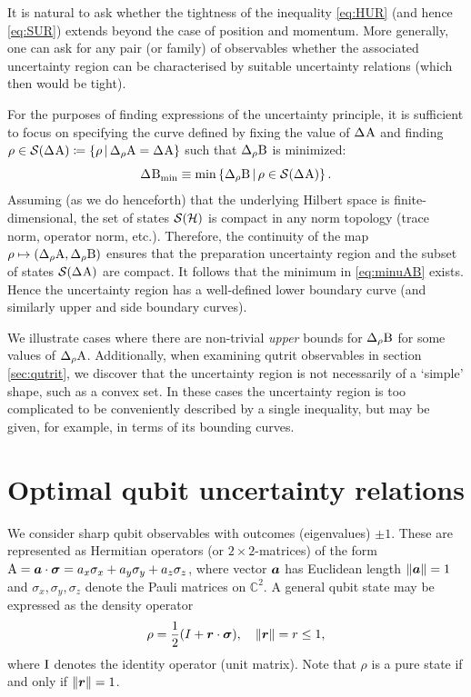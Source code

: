 It is natural to ask whether the tightness of the inequality \eqref{eq:HUR} (and hence \eqref{eq:SUR}) extends beyond the case of position and momentum. More generally, one can ask for any pair (or family) of observables whether the associated uncertainty region can be characterised by suitable uncertainty relations (which then would be tight).

For the purposes of finding expressions of the uncertainty principle, it is sufficient to focus on specifying the curve defined by fixing the value of $\sdev{\opa}$ and finding $\rho\in\si(\sdev{\opa})\coloneqq\{\rho\,|\,\sdevr{\opa}=\sdev{\opa}\}$ such that $\sdevr{\opb}$ is minimized:
\begin{equation}\label{eq:minuAB}
  \sdevmin{\opb}\equiv\min\left\{\sdevr{\opb}\,|\,\rho \in\si(\sdev{\opa}) \right\}.
\end{equation}
Assuming (as we do henceforth) that the underlying Hilbert space is finite-dimensional, the set of states $\mathcal{S}(\mathcal{H})$ is compact in any norm topology (trace norm, operator norm, etc.). Therefore, the continuity of the map $\rho\mapsto (\sdevr{\opa},\sdevr{\opb})$ ensures that the preparation uncertainty region and the subset of states $\si(\sdev{\opa})$ are  compact. It follows that the minimum in \eqref{eq:minuAB} exists. Hence the uncertainty region has a well-defined  lower boundary curve (and similarly upper and side boundary curves).

We illustrate cases where there are non-trivial \emph{upper} bounds for $\sdevr{\opb}$ for some values of $\sdevr{\opa}$. Additionally, when examining qutrit observables in section \ref{sec:qutrit}, we discover that the uncertainty region is not necessarily of a `simple' shape, such as a convex set. In these cases the uncertainty region is too complicated to be conveniently described by a single inequality, but may be given, for example, in terms of its bounding curves.

\section{Optimal qubit uncertainty relations}\label{sec:qubit}

We consider sharp qubit observables with outcomes (eigenvalues) $\pm 1$. These are represented as Hermitian operators (or $2\times 2$-matrices) of the form $\operatorname{A}=\bm{a}\cdot{\boldsymbol\sigma}=a_x\sigma_x+a_y\sigma_y+a_z\sigma_z$, where vector $\bm{a}$ has Euclidean length  $\|\bm{a}\|=1$ and  $\sigma_x,\sigma_y,\sigma_z$ denote the Pauli matrices on ${\mathbb C}^2$. A general qubit state may be expressed as the density operator
\begin{equation}
  \rho=\frac12(I+\bm{r}\cdot{\boldsymbol\sigma}),\quad \|\bm{r}\|=r\le 1,
\end{equation}
where $\operatorname{I}$ denotes the identity operator (unit matrix). Note that $\rho$ is a pure state if and only if $\|\bm{r}\|=1$.

